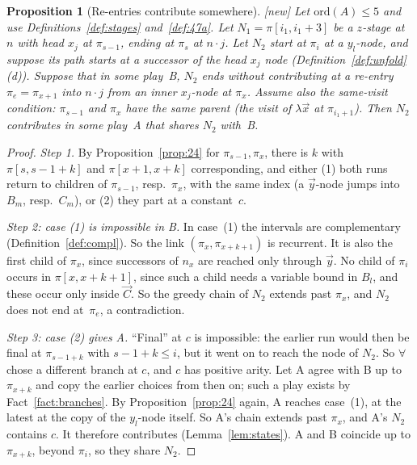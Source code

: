 \documentclass[11pt]{article}
\newcommand{\ord}{\mathrm{ord}}
\newcommand{\suc}[2]{#1{\cdot}#2}
\newcommand{\iv}[2]{\pi[#1,#2]}
\newcommand{\New}{\textsf{[new]}}
\theoremstyle{plain}
\newtheorem{proposition}[theorem]{Proposition}
\theoremstyle{definition}
\theoremstyle{remark}
\begin{document}
\begin{proposition}[Re-entries contribute somewhere]\label{prop:reentry}
\New{} Let $\ord(A)\le5$ and use Definitions~\ref{def:stages}
and~\ref{def:47a}.  Let $N_1=\iv{i_1}{i_1+3}$ be a $z$-stage at $n$ with
head $x_j$ at $\pi_{s-1}$, ending at $\pi_s$ at $\suc nj$.  Let $N_2$
start at $\pi_i$ at a $y_l$-node, and suppose its path starts at a
successor of the head $x_j$ node (Definition~\ref{def:unfold}(d)).
Suppose that in some play~B, $N_2$ ends without contributing at a
re-entry $\pi_e=\pi_{x+1}$ into $\suc nj$ from an inner $x_j$-node at
$\pi_x$.  Assume also the \emph{same-visit} condition: $\pi_{s-1}$ and
$\pi_x$ have the same parent (the visit of $\lambda\vec x$ at
$\pi_{i_1+1}$).  Then $N_2$ contributes in some play~A that shares $N_2$
with~B.
\end{proposition}
\begin{proof}
\emph{Step 1.} By Proposition~\ref{prop:24} for $\pi_{s-1},\pi_x$, there
is $k$ with $\iv s{s-1+k}$ and $\iv{x+1}{x+k}$ corresponding, and
either (1) both runs return to children of $\pi_{s-1}$, resp.\ $\pi_x$,
with the same index (a $\vec y$-node jumps into $B_m$, resp.\ $C_m$), or
(2) they part at a constant~$c$.

\emph{Step 2: case (1) is impossible in B.}  In case~(1) the intervals
are complementary (Definition~\ref{def:compl}).  So the link
$(\pi_x,\pi_{x+k+1})$ is recurrent.  It is also the first child of
$\pi_x$, since successors of $n_x$ are reached only through $\vec y$.
No child of $\pi_i$ occurs in $\iv x{x+k+1}$, since such a child needs a
variable bound in $B_l$, and these occur only inside $\vec C$.  So the
greedy chain of $N_2$ extends past $\pi_x$, and $N_2$ does not end
at~$\pi_e$, a contradiction.

\emph{Step 3: case (2) gives A.}  ``Final'' at $c$ is impossible: the
earlier run would then be final at $\pi_{s-1+k}$ with $s-1+k\le i$, but
it went on to reach the node of $N_2$.  So $\forall$ chose a different
branch at $c$, and $c$ has positive arity.  Let A agree with B up to
$\pi_{x+k}$ and copy the earlier choices from then on; such a play exists
by Fact~\ref{fact:branches}.  By Proposition~\ref{prop:24} again, A
reaches case~(1), at the latest at the copy of the $y_l$-node itself.
So A's chain extends past $\pi_x$, and A's $N_2$ contains $c$.  It
therefore contributes (Lemma~\ref{lem:states}).  A and B coincide up to
$\pi_{x+k}$, beyond $\pi_i$, so they share $N_2$.
\end{proof}
\end{document}
